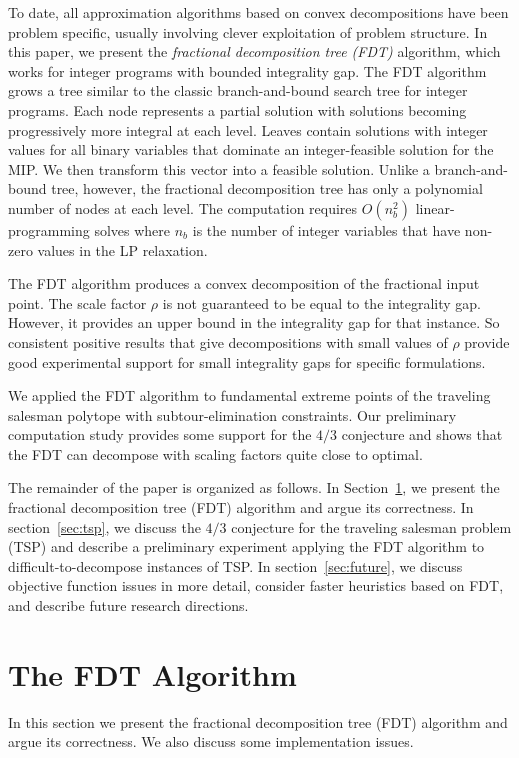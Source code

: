 \documentclass[11pt]{article}
\begin{document}
To date, all approximation algorithms based on convex decompositions
have been problem specific, usually involving clever exploitation of
problem structure.  In this paper, we present the {\em fractional
decomposition tree (FDT)} algorithm, which works for integer programs
with bounded integrality gap.  The FDT algorithm grows a tree similar
to the classic branch-and-bound search tree for integer programs.
Each node represents a partial solution with solutions becoming
progressively more integral at each level.  Leaves contain solutions
with integer values for all binary variables that dominate an
integer-feasible solution for the MIP.  We then transform this vector
into a feasible solution.  Unlike a branch-and-bound tree, however,
the fractional decomposition tree has only a polynomial number of
nodes at each level.  The computation requires $O(n_b^2)$
linear-programming solves where $n_b$ is the number of integer
variables that have non-zero values in the LP relaxation.

The FDT algorithm produces a convex decomposition of the fractional
input point.  The scale factor $\rho$ is not guaranteed to be equal to
the integrality gap.  However, it provides an upper bound in the
integrality gap for that instance.  So consistent positive results
that give decompositions with small values of $\rho$ provide good
experimental support for small integrality gaps for specific
formulations.

We applied the FDT algorithm to fundamental extreme points of the
traveling salesman polytope with subtour-elimination constraints.
Our preliminary computation study provides some support for the $4/3$
conjecture and shows that the FDT can decompose with scaling factors
quite close to optimal.

The remainder of the paper is organized as follows.  In
Section~\ref{sec:FDT}, we present the fractional decomposition tree
(FDT) algorithm and argue its correctness.  In section~\ref{sec:tsp},
we discuss the $4/3$ conjecture for the traveling salesman problem
(TSP) and describe a preliminary experiment applying the FDT algorithm
to difficult-to-decompose instances of TSP.  In
section~\ref{sec:future}, we discuss objective function issues in more
detail, consider faster heuristics based on FDT, and describe future
research directions.

\section{The FDT Algorithm}
\label{sec:FDT}
In this section we present the fractional decomposition tree (FDT) algorithm
and argue its correctness.  We also discuss some implementation issues.
\end{document}
